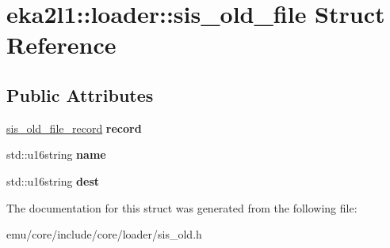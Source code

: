 \hypertarget{structeka2l1_1_1loader_1_1sis__old__file}{}\section{eka2l1\+:\+:loader\+:\+:sis\+\_\+old\+\_\+file Struct Reference}
\label{structeka2l1_1_1loader_1_1sis__old__file}
\subsection*{Public Attributes}
\begin{DoxyCompactItemize}
\item 
\mbox{\label{structeka2l1_1_1loader_1_1sis__old__file_a79f6ca6a9fcca14e7849f40096d708cb}} 
\mbox{\hyperlink{structeka2l1_1_1loader_1_1sis__old__file__record}{sis\+\_\+old\+\_\+file\+\_\+record}} {\bfseries record}
\item 
\mbox{\label{structeka2l1_1_1loader_1_1sis__old__file_a5698a401707c724df3d7839a26449aea}} 
std\+::u16string {\bfseries name}
\item 
\mbox{\label{structeka2l1_1_1loader_1_1sis__old__file_a2107fbcedece3e0dab7e896c0ce2321d}} 
std\+::u16string {\bfseries dest}
\end{DoxyCompactItemize}


The documentation for this struct was generated from the following file\+:\begin{DoxyCompactItemize}
\item 
emu/core/include/core/loader/sis\+\_\+old.\+h\end{DoxyCompactItemize}

